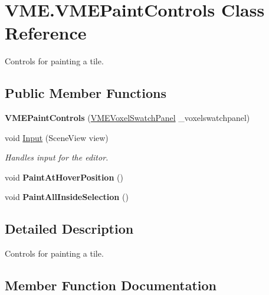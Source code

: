 \hypertarget{class_v_m_e_1_1_v_m_e_paint_controls}{}\section{V\+M\+E.\+V\+M\+E\+Paint\+Controls Class Reference}
\label{class_v_m_e_1_1_v_m_e_paint_controls}


Controls for painting a tile.  


\subsection*{Public Member Functions}
\begin{DoxyCompactItemize}
\item 
{\bfseries V\+M\+E\+Paint\+Controls} (\hyperlink{class_v_m_e_1_1_v_m_e_voxel_swatch_panel}{V\+M\+E\+Voxel\+Swatch\+Panel} \+\_\+voxelswatchpanel)\hypertarget{class_v_m_e_1_1_v_m_e_paint_controls_adf1c8518e7482f8c9dc60c3689522fcf}{}\label{class_v_m_e_1_1_v_m_e_paint_controls_adf1c8518e7482f8c9dc60c3689522fcf}

\item 
void \hyperlink{class_v_m_e_1_1_v_m_e_paint_controls_a2bca3f29d49888d2f347372cccca6c3e}{Input} (Scene\+View view)
\begin{DoxyCompactList}\small\item\em Handles input for the editor. \end{DoxyCompactList}\item 
void {\bfseries Paint\+At\+Hover\+Position} ()\hypertarget{class_v_m_e_1_1_v_m_e_paint_controls_ad6b6ad3272b64d521e87022ab2d8298f}{}\label{class_v_m_e_1_1_v_m_e_paint_controls_ad6b6ad3272b64d521e87022ab2d8298f}

\item 
void {\bfseries Paint\+All\+Inside\+Selection} ()\hypertarget{class_v_m_e_1_1_v_m_e_paint_controls_a4e93f94dc7530adb6864d47f99677507}{}\label{class_v_m_e_1_1_v_m_e_paint_controls_a4e93f94dc7530adb6864d47f99677507}

\end{DoxyCompactItemize}


\subsection{Detailed Description}
Controls for painting a tile. 



\subsection{Member Function Documentation}
